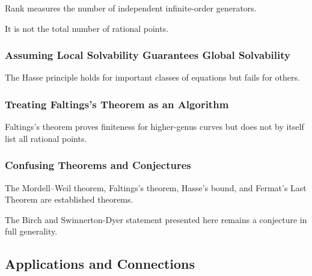 Rank measures the number of independent infinite-order generators.

It is not the total number of rational points.

\subsubsection{Assuming Local Solvability Guarantees Global Solvability}

The Hasse principle holds for important classes of equations but fails for
others.

\subsubsection{Treating Faltings's Theorem as an Algorithm}

Faltings's theorem proves finiteness for higher-genus curves but does not by
itself list all rational points.

\subsubsection{Confusing Theorems and Conjectures}

The Mordell--Weil theorem, Faltings's theorem, Hasse's bound, and Fermat's
Last Theorem are established theorems.

The Birch and Swinnerton-Dyer statement presented here remains a conjecture
in full generality.

\subsection{Applications and Connections}
\label{subsec:diophantine-geometry-applications}

